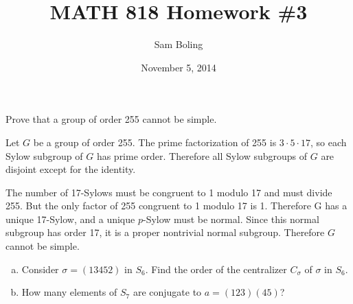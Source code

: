 \documentclass{article}
\title{MATH 818 Homework \#3}
\date{November 5, 2014}
\author{Sam Boling}
\newcounter{Problem}
\newenvironment{Problem}{\begin{Exercise}[name={Problem},
                                          counter={Problem}]}
                        {\end{Exercise}}
\begin{document}
\begin{titlepage}
\maketitle
\end{titlepage}

\begin{Problem}
Prove that a group of order 255 cannot be simple.
\end{Problem}

\begin{Answer}
Let $G$ be a group of order 255. The prime factorization of 255 is
$3 \cdot 5 \cdot 17$, so each Sylow subgroup of $G$ has prime
order. Therefore all Sylow subgroups of $G$ are disjoint except for
the identity.

The number of 17-Sylows must be congruent to 1 modulo 17 and must divide
255. But the only factor of 255 congruent to 1 modulo 17 is 1. Therefore
G has a unique 17-Sylow, and a unique $p$-Sylow must be normal. Since
this normal subgroup has order 17, it is a proper nontrivial normal
subgroup. Therefore $G$ cannot be simple.
\end{Answer}

\pagebreak

\begin{Problem}
\begin{enumerate}[(a)]
  \item{
    Consider $\sigma = (13452)$ in $S_6$. Find the order of the
    centralizer $C_\sigma$ of $\sigma$ in $S_6$.
  }
  \item{
    How many elements of $S_7$ are conjugate to $a = (123)(45)$?
  }
\end{enumerate}
\end{Problem}
\end{document}
